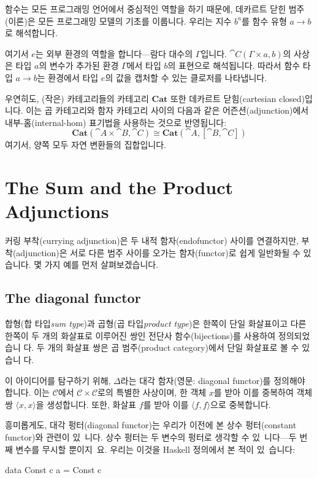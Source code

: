 \documentclass[DaoFP]{subfiles}
\begin{document}
함수는 모든 프로그래밍 언어에서 중심적인 역할을 하기 때문에, 데카르트 닫힌 범주(이론)은 모든 프로그래밍 모델의 기초를 이룹니다. 우리는 지수 $b^a$를 함수 유형 $a \to b$로 해석합니다.

여기서 $e$는 외부 환경의 역할을 합니다---람다 대수의 $\Gamma$입니다. $\cat C(\Gamma \times a, b)$의 사상은 타입 $a$의 변수가 추가된 환경 $\Gamma$에서 타입 $b$의 표현으로 해석됩니다. 따라서 함수 타입 $a \to b$는 환경에서 타입 $e$의 값을 캡처할 수 있는 클로저를 나타냅니다.

우연히도, (작은) 카테고리들의 카테고리 $\mathbf{Cat}$ 또한 데카르트 닫힘(cartesian closed)입니다. 이는 곱 카테고리와 함자 카테고리 사이의 다음과 같은 어즌션(adjunction)에서 내부-홈(internal-hom) 표기법을 사용하는 것으로 반영됩니다:
\[ \mathbf{Cat} (\cat A \times \cat B, \cat C) \cong \mathbf{Cat} (\cat A, [\cat B, \cat C]) \]
여기서, 양쪽 모두 자연 변환들의 집합입니다.


\section{The Sum and the Product Adjunctions}

커링 부착(currying adjunction)은 두 내적 함자(endofunctor) 사이를 연결하지만, 부착(adjunction)은 서로 다른 범주 사이를 오가는 함자(functor)로 쉽게 일반화될 수 있습니다. 몇 가지 예를 먼저 살펴보겠습니다.

\subsection{The diagonal functor}

합형(합 타입\textit{sum type})과 곱형(곱 타입\textit{product type})은 한쪽이 단일 화살표이고 다른 한쪽이 두 개의 화살표로 이루어진 쌍인 전단사 함수(bijections)를 사용하여 정의되었습니 다. 두 개의 화살표 쌍은 곱 범주(product category)에서 단일 화살표로 볼 수 있습니 다.

이 아이디어를 탐구하기 위해, $\Delta$라는 대각 함자(영문: diagonal functor)를 정의해야 합니다. 이는 $\mathcal{C}$에서 $\mathcal{C} \times \mathcal{C}$로의 특별한 사상이며, 한 객체 $x$를 받아 이를 중복하여 객체 쌍 $\langle x, x \rangle$을 생성합니다. 또한, 화살표 $f$를 받아 이를 $\langle f, f \rangle$으로 중복합니다.

흥미롭게도, 대각 펑터(diagonal functor)는 우리가 이전에 본 상수 펑터(constant functor)와 관련이 있~니다. 상수 펑터는 두 변수의 펑터로 생각할 수 있~니다---두 번째 변수를 무시할 뿐이지~요. 우리는 이것을 Haskell 정의에서 본 적이 있~습니다:
\begin{haskell}
data Const c a = Const c
\end{haskell}
\end{document}
